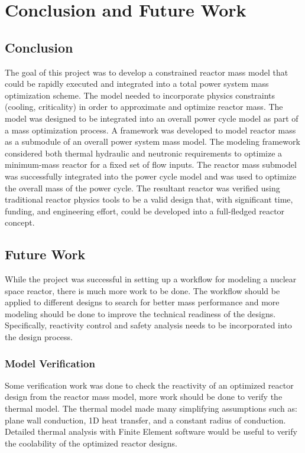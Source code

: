 \chapter{Conclusion and Future Work}

\section{Conclusion}
The goal of this project was to develop a constrained reactor mass model that
could be rapidly executed and integrated into a total power system mass
optimization scheme. The model needed to incorporate physics
constraints (cooling, criticality) in order to approximate and optimize reactor
mass. The model was designed to be integrated
into an overall power cycle model as part of a mass optimization process. A
framework was developed to model reactor mass as a submodule of an overall
power system mass model. The modeling framework considered both thermal
hydraulic and neutronic requirements to optimize a minimum-mass reactor for a
fixed set of flow inputs. The reactor mass submodel was successfully integrated
into the power cycle model and was used to optimize the overall mass of the
power cycle. The resultant reactor was verified using traditional reactor
physics tools to be a valid design that, with significant time, funding, and
engineering effort, could be developed into a full-fledged reactor concept.

\section{Future Work}
While the project was successful in setting up a workflow for modeling a nuclear
space reactor, there is much more work to be done. The workflow should be
applied to different designs to search for better mass performance and more
modeling should be done to improve the technical readiness of the designs.
Specifically, reactivity control and safety analysis needs to be incorporated
into the design process.

\subsection{Model Verification}
Some verification work was done to check the reactivity of an optimized reactor
design from the reactor mass model, more work should be done to verify the thermal
model. The thermal model made many simplifying assumptions such as: plane wall
conduction, 1D heat transfer, and a constant radius of conduction. Detailed
thermal analysis with Finite Element software would be useful to verify the
coolability of the optimized reactor designs.

